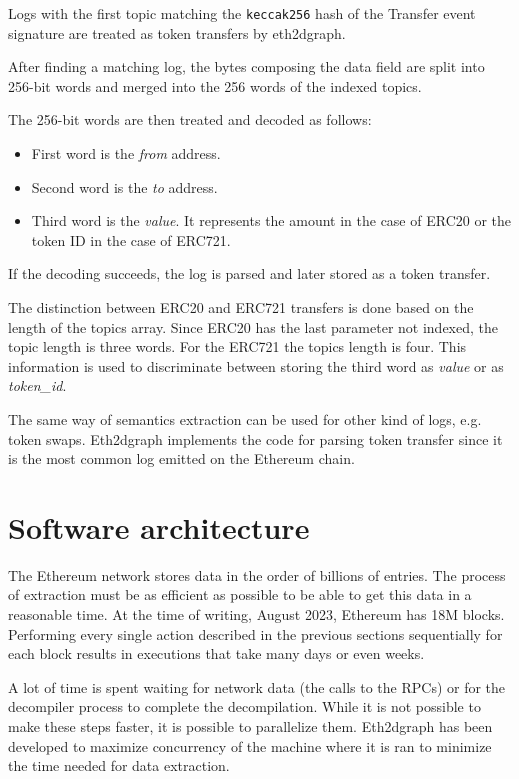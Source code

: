 Logs with the first topic matching the {\tt keccak256} hash of the Transfer event signature are treated as token transfers by eth2dgraph.

After finding a matching log, the bytes composing the data field are split into 256-bit words and merged into the 256 words of the indexed topics.

The 256-bit words are then treated and decoded as follows:

\begin{itemize}
    \item First word is the \textit{from} address.
    \item Second word is the \textit{to} address.
    \item Third word is the \textit{value}. It represents the amount in the case of ERC20 or the token ID in the case of ERC721.
\end{itemize}

If the decoding succeeds, the log is parsed and later stored as a token transfer.

The distinction between ERC20 and ERC721 transfers is done based on the length of the topics array. Since ERC20 has the last parameter not indexed, the topic length is three words. For the ERC721 the topics length is four. This information is used to discriminate between storing the third word as \textit{value} or as \textit{token\_id}.

The same way of semantics extraction can be used for other kind of logs, e.g. token swaps. Eth2dgraph implements the code for parsing token transfer since it is the most common log emitted on the Ethereum chain.

\section{Software architecture}

The Ethereum network stores data in the order of billions of entries. The process of extraction must be as efficient as possible to be able to get this data in a reasonable time. At the time of writing, August 2023, Ethereum has 18M blocks. Performing every single action described in the previous sections sequentially for each block results in executions that take many days or even weeks. 

A lot of time is spent waiting for network data (the calls to the RPCs) or for the decompiler process to complete the decompilation. While it is not possible to make these steps faster, it is possible to parallelize them. Eth2dgraph has been developed to maximize concurrency of the machine where it is ran to minimize the time needed for data extraction.

